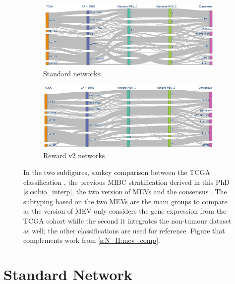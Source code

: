 \begin{figure}[!b]
    \centering
    \begin{subfigure}{1.0\linewidth}
        \includegraphics[width=1.0\textwidth,keepaspectratio]{Sections/Network_II/validation/mevs_comp_std_K_7.png}
        \caption{Standard networks}
    \end{subfigure} %
    \centering
    \begin{subfigure}{1.0\linewidth}
        \includegraphics[width=1.0\textwidth,keepaspectratio]{Sections/Network_II/validation/mevs_comp_rwd_K_7.png}
        \caption{Reward v2 networks}
    \end{subfigure}
    \centering
    \caption{In the two subfigures, sankey comparison between the TCGA classification \citep{Robertson2017-mg}, the previous MIBC stratification derived in this PhD \cref{s:cs:bio_interp}, the two version of MEVs and the consensus \citep{Kamoun2020-tj}. The subtyping based on the two MEVs are the main groups to compare as the version of MEV only considers the gene expression from the TCGA cohort while the second it integrates the non-tumour dataset as well; the other classifications are used for reference. Figure that complements work from \cref{s:N_II:mev_comp}. }
    \label{fig:ap:mevs_comp}
\end{figure}


\section{Standard Network} \label{ap:N_II:coms}

